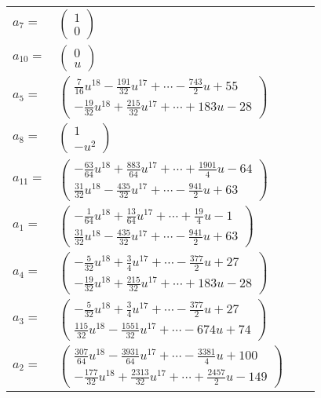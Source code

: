 \documentclass[1p]{elsarticle_modified}
\theoremstyle{definition}
\begin{document}
\begin{tabular}{m{7pt} m{180pt} m{7pt} m{180pt} }
\flushright $a_{7}=$&$\begin{pmatrix}1\\0\end{pmatrix}$ \\
\flushright $a_{10}=$&$\begin{pmatrix}0\\u\end{pmatrix}$ \\
\flushright $a_{5}=$&$\begin{pmatrix}\frac{7}{16} u^{18}-\frac{191}{32} u^{17}+\cdots-\frac{743}{2} u+55\\-\frac{19}{32} u^{18}+\frac{215}{32} u^{17}+\cdots+183 u-28\end{pmatrix}$ \\
\flushright $a_{8}=$&$\begin{pmatrix}1\\- u^2\end{pmatrix}$ \\
\flushright $a_{11}=$&$\begin{pmatrix}-\frac{63}{64} u^{18}+\frac{883}{64} u^{17}+\cdots+\frac{1901}{4} u-64\\\frac{31}{32} u^{18}-\frac{435}{32} u^{17}+\cdots-\frac{941}{2} u+63\end{pmatrix}$ \\
\flushright $a_{1}=$&$\begin{pmatrix}-\frac{1}{64} u^{18}+\frac{13}{64} u^{17}+\cdots+\frac{19}{4} u-1\\\frac{31}{32} u^{18}-\frac{435}{32} u^{17}+\cdots-\frac{941}{2} u+63\end{pmatrix}$ \\
\flushright $a_{4}=$&$\begin{pmatrix}-\frac{5}{32} u^{18}+\frac{3}{4} u^{17}+\cdots-\frac{377}{2} u+27\\-\frac{19}{32} u^{18}+\frac{215}{32} u^{17}+\cdots+183 u-28\end{pmatrix}$ \\
\flushright $a_{3}=$&$\begin{pmatrix}-\frac{5}{32} u^{18}+\frac{3}{4} u^{17}+\cdots-\frac{377}{2} u+27\\\frac{115}{32} u^{18}-\frac{1551}{32} u^{17}+\cdots-674 u+74\end{pmatrix}$ \\
\flushright $a_{2}=$&$\begin{pmatrix}\frac{307}{64} u^{18}-\frac{3931}{64} u^{17}+\cdots-\frac{3381}{4} u+100\\-\frac{177}{32} u^{18}+\frac{2313}{32} u^{17}+\cdots+\frac{2457}{2} u-149\end{pmatrix}$ \\

\end{tabular}
\end{document}
